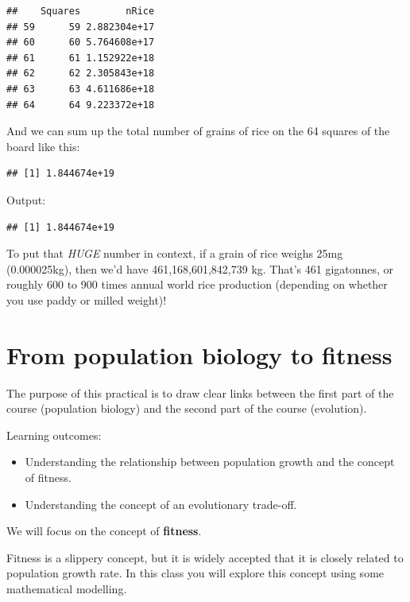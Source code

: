 \documentclass[
  a4paper]{book}
\newenvironment{Shaded}{\begin{snugshade}}{\end{snugshade}}
\newcommand{\FunctionTok}[1]{\textcolor[rgb]{0.13,0.29,0.53}{\textbf{#1}}}
\newcommand{\NormalTok}[1]{#1}
\newcommand{\SpecialCharTok}[1]{\textcolor[rgb]{0.81,0.36,0.00}{\textbf{#1}}}
\providecommand{\tightlist}{%
  \setlength{\itemsep}{0pt}\setlength{\parskip}{0pt}}
\begin{document}
\begin{verbatim}
##    Squares        nRice
## 59      59 2.882304e+17
## 60      60 5.764608e+17
## 61      61 1.152922e+18
## 62      62 2.305843e+18
## 63      63 4.611686e+18
## 64      64 9.223372e+18
\end{verbatim}

And we can sum up the total number of grains of rice on the 64 squares of the board like this:

\begin{Shaded}
\end{Shaded}

\begin{verbatim}
## [1] 1.844674e+19
\end{verbatim}

Output:

\begin{verbatim}
## [1] 1.844674e+19
\end{verbatim}

To put that \emph{HUGE} number in context, if a grain of rice weighs 25mg (0.000025kg), then we'd have 461,168,601,842,739 kg. That's 461 gigatonnes, or roughly 600 to 900 times annual world rice production (depending on whether you use paddy or milled weight)!

\chapter{From population biology to fitness}\label{from-population-biology-to-fitness}

The purpose of this practical is to draw clear links between the first part of the course (population biology) and the second part of the course (evolution).

Learning outcomes:

\begin{itemize}
\tightlist
\item
  Understanding the relationship between population growth and the concept of fitness.
\item
  Understanding the concept of an evolutionary trade-off.
\end{itemize}

We will focus on the concept of \textbf{fitness}.

Fitness is a slippery concept, but it is widely accepted that it is closely related to population growth rate. In this class you will explore this concept using some mathematical modelling.
\end{document}
